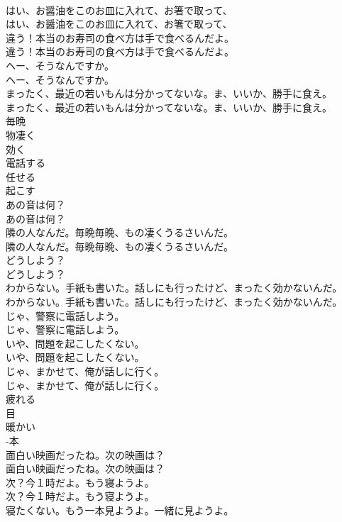 \documentclass[8pt]{extreport}
\begin{document}
\begin{CJK}{UTF8}{min}
\\	はい、お醤油をこのお皿に入れて、お箸で取って、	
\\	はい、お醤油をこのお皿に入れて、お箸で取って、 
\\	違う！本当のお寿司の食べ方は手で食べるんだよ。	
\\	違う！本当のお寿司の食べ方は手で食べるんだよ。 
\\	ヘー、そうなんですか。	
\\	ヘー、そうなんですか。 
\\	まったく、最近の若いもんは分かってないな。ま、いいか、勝手に食え。	
\\	まったく、最近の若いもんは分かってないな。ま、いいか、勝手に食え。 
\\	毎晩
\\	物凄く
\\	効く
\\	電話する
\\	任せる
\\	起こす
\\	あの音は何？	
\\	あの音は何？ 
\\	隣の人なんだ。毎晩毎晩、もの凄くうるさいんだ。	
\\	隣の人なんだ。毎晩毎晩、もの凄くうるさいんだ。 
\\	どうしよう？	
\\	どうしよう？ 
\\	わからない。手紙も書いた。話しにも行ったけど、まったく効かないんだ。	
\\	わからない。手紙も書いた。話しにも行ったけど、まったく効かないんだ。 
\\	じゃ、警察に電話しよう。	
\\	じゃ、警察に電話しよう。 
\\	いや、問題を起こしたくない。	
\\	いや、問題を起こしたくない。 
\\	じゃ、まかせて、俺が話しに行く。	
\\	じゃ、まかせて、俺が話しに行く。 
\\	疲れる
\\	目
\\	暖かい
\\	-本
\\	面白い映画だったね。次の映画は？	
\\	面白い映画だったね。次の映画は？ 
\\	次？今１時だよ。もう寝ようよ。	
\\	次？今１時だよ。もう寝ようよ。 
\\	寝たくない。もう一本見ようよ。一緒に見ようよ。	

\end{CJK}
\end{document}

